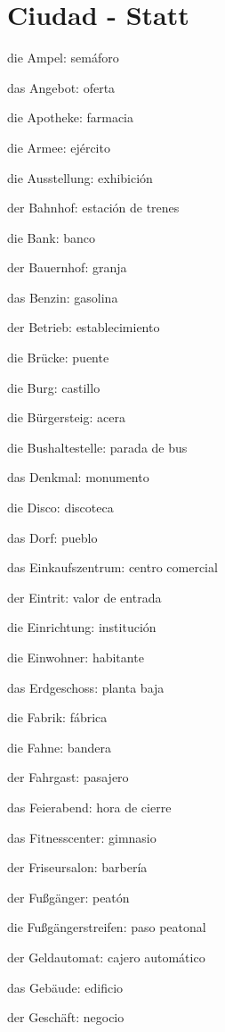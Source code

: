 \section{Ciudad - Statt}
\begin{multicols}{2}
\begin{myitemize}
\item die Ampel: semáforo
\item das Angebot: oferta
\item die Apotheke: farmacia
\item die Armee: ejército
\item die Ausstellung: exhibición
\item der Bahnhof: estación de trenes
\item die Bank: banco
\item der Bauernhof: granja
\item das Benzin: gasolina
\item der Betrieb: establecimiento
\item die Brücke: puente
\item die Burg: castillo
\item die Bürgersteig: acera
\item die Bushaltestelle: parada de bus
\item das Denkmal: monumento
\item die Disco: discoteca
\item das Dorf: pueblo
\item das Einkaufszentrum: centro comercial
\item der Eintrit: valor de entrada
\item die Einrichtung: institución
\item die Einwohner: habitante
\item das Erdgeschoss: planta baja
\item die Fabrik: fábrica
\item die Fahne: bandera
\item der Fahrgast: pasajero
\item das Feierabend: hora de cierre
\item das Fitnesscenter: gimnasio
\item der Friseursalon: barbería
\item der Fußgänger: peatón
\item die Fußgängerstreifen: paso peatonal
\item der Geldautomat: cajero automático
\item das Gebäude: edificio
\item der Geschäft: negocio

\end{myitemize}
\end{multicols}
